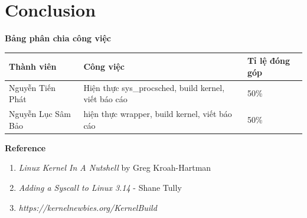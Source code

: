 \documentclass[a4paper]{article}
\begin{document}
\section{Conclusion}
\textbf{Bảng phân chia công việc}
\begin{center}
\begin{tabular}{|p{4cm}|p{6cm}|p{3cm} } 
 \hline
 Thành viên  & Công việc & Tỉ lệ đóng góp\\ \hline
 Nguyễn Tiến Phát & Hiện thực sys\_procsched, build kernel, viết báo cáo & 50\%\\\hline 
 Nguyễn Lục Sâm Bảo & hiện thực wrapper, build kernel, viết báo cáo & 50\%\\
 \hline
\end{tabular}
\end{center}
\textbf{Reference}
\begin{enumerate}
\item \textit{Linux Kernel In A Nutshell} by Greg Kroah-Hartman
\item \textit{Adding a Syscall to Linux 3.14} - Shane Tully
\item \textit{https://kernelnewbies.org/KernelBuild}
\end{enumerate}
\end{document}
